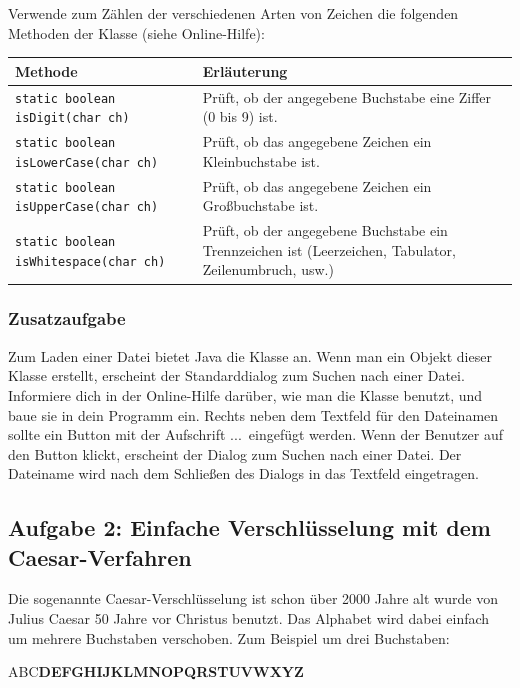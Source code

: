 Verwende zum Zählen der verschiedenen Arten von Zeichen die folgenden Methoden
der Klasse  (siehe Online-Hilfe):

\bgroup
\def\arraystretch{1.2}
\begin{tabularx}{\textwidth}{|p{70mm}|X|}
\hline
\textbf{Methode} & \textbf{Erläuterung}
\\ \hline
\lstinline|static boolean isDigit(char ch)| & 
Prüft, ob der angegebene Buchstabe eine Ziffer (0 bis 9) ist.
\\ \hline
\lstinline|static boolean isLowerCase(char ch)| &
Prüft, ob das angegebene Zeichen ein Kleinbuchstabe ist. 
\\ \hline
\lstinline|static boolean isUpperCase(char ch)| &
Prüft, ob das angegebene Zeichen ein Großbuchstabe ist. 
\\ \hline
\lstinline|static boolean isWhitespace(char ch)| &
Prüft, ob der angegebene Buchstabe ein Trennzeichen ist (Leerzeichen,
Tabulator, Zeilenumbruch, usw.) \\ \hline
\end{tabularx}
\egroup

\subsubsection{Zusatzaufgabe}

Zum Laden einer Datei bietet Java die Klasse  an. Wenn man
ein Objekt dieser Klasse erstellt, erscheint der Standarddialog zum Suchen nach
einer Datei. Informiere dich in der Online-Hilfe darüber, wie man die Klasse
 benutzt, und baue sie in dein Programm ein. Rechts neben
dem Textfeld für den Dateinamen sollte ein Button mit der Aufschrift
\glqq ...\grqq\ eingefügt werden. Wenn der Benutzer auf den Button klickt,
erscheint der Dialog zum Suchen nach einer Datei. Der Dateiname wird nach dem
Schließen des Dialogs in das Textfeld eingetragen.


\subsection{Aufgabe 2: Einfache Verschlüsselung mit dem Caesar-Verfahren}

Die sogenannte  Caesar-Verschlüsselung ist schon über 2000 Jahre alt wurde von
Julius Caesar 50 Jahre vor Christus benutzt. Das Alphabet wird dabei einfach um
mehrere Buchstaben verschoben. Zum Beispiel um drei Buchstaben:

ABC\textbf{DEFGHIJKLMNOPQRSTUVWXYZ}

